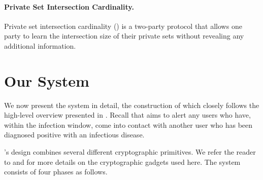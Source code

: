 \paragraph{Private Set Intersection Cardinality.}	
Private set intersection cardinality (\psica) is a two-party protocol that allows one party to learn the intersection size of their private sets without revealing any additional information. 

\section{Our \dect System}
\label{sect:system}
We now present the \dect system in detail, the construction of which closely
follows the high-level overview presented in . Recall that \dect aims to alert any users who have, within the infection window, come into contact with another user who has been diagnosed positive with an infectious disease.



\dect's design combines several different cryptographic primitives. %
We refer the reader to  and  for more details on the cryptographic gadgets used here. The \dect system consists of four phases as follows.

